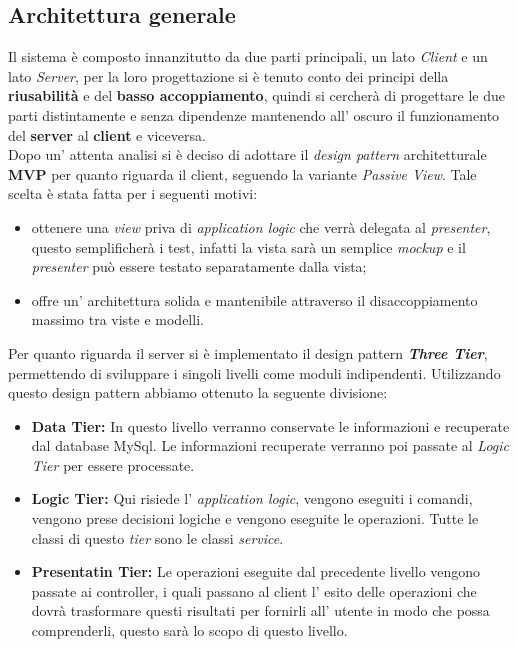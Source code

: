 \subsection{Architettura generale}
Il sistema \progetto{} è composto innanzitutto da due parti principali, un lato \textit{Client} e un lato \textit{Server}, per la loro progettazione si è tenuto conto dei principi della \textbf{riusabilità} e del \textbf{basso accoppiamento}, quindi si cercherà di progettare le due parti distintamente e senza dipendenze mantenendo all' oscuro il funzionamento del \textbf{server} al \textbf{client} e viceversa.\\
Dopo un' attenta analisi si è deciso di adottare il \textit{design pattern} architetturale \textbf{MVP} per quanto riguarda il client, seguendo la variante \textit{Passive View}. Tale scelta è stata fatta per i seguenti motivi:
\begin{itemize}
	\item ottenere una \textit{view} priva di \textit{application logic} che verrà delegata al \textit{presenter}, questo semplificherà i test, infatti la vista sarà un semplice \textit{mockup} e il \textit{presenter} può essere testato separatamente dalla vista;
	\item offre un' architettura solida e mantenibile attraverso il disaccoppiamento massimo tra viste e modelli.
\end{itemize}
Per quanto riguarda il server si è implementato il design pattern \textbf{\textit{Three Tier}}, permettendo di sviluppare i singoli livelli come moduli indipendenti. Utilizzando questo design pattern abbiamo ottenuto la seguente divisione:
\begin{itemize}
	\item \textbf{Data Tier: } In questo livello verranno conservate le informazioni e recuperate dal database MySql. Le informazioni recuperate verranno poi passate al \textit{Logic Tier} per essere processate. 
	\item \textbf{Logic Tier: } Qui risiede l' \textit{application logic}, vengono eseguiti i comandi, vengono prese decisioni logiche e vengono eseguite le operazioni. Tutte le classi di questo \textit{tier} sono le classi \textit{service}.
	\item \textbf{Presentatin Tier: } Le operazioni eseguite dal precedente livello vengono passate ai controller, i quali passano al client l' esito delle operazioni che dovrà trasformare questi risultati per fornirli all' utente in modo che possa comprenderli, questo sarà lo scopo di questo livello.
\end{itemize}
